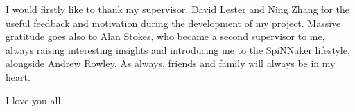 I would firstly like to thank my supervisor, David Lester and Ning Zhang for the useful feedback and motivation during the development of my project. Massive gratitude goes also to Alan Stokes, who became a second supervisor to me, always raising interesting insights and introducing me to the SpiNNaker lifestyle, alongside Andrew Rowley. As always, friends and family will always be in my heart.

I love you all.